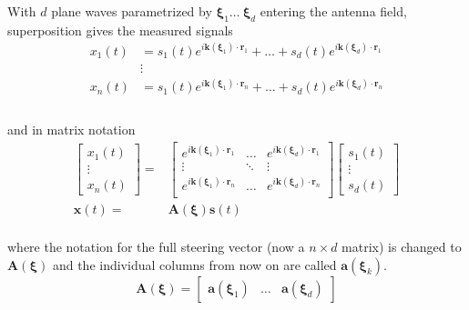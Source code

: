 \documentclass[11pt]{article}
\newcommand{\vct}[1]{\boldsymbol{#1}}
\begin{document}
With $d$ plane waves parametrized by $\vct{\xi}_1 \dots\ \vct{\xi}_d$ entering the antenna field, superposition gives the measured signals
\begin{equation}
    \begin{split}
        x_1(t)& = s_1(t)e^{i{\vct{k}(\vct{\xi}_1)}\cdot{\vct{r}_1}} + \dots + s_d(t)e^{i{\vct{k}(\vct{\xi}_d)}\cdot{\vct{r}_1}}\\
        &\vdots\\
        x_n(t)& = s_1(t)e^{i{\vct{k}(\vct{\xi}_1)}\cdot{\vct{r}_n}} + \dots + s_d(t)e^{i{\vct{k}(\vct{\xi}_d)}\cdot{\vct{r}_n}}\\
    \end{split}
\end{equation}
\\and in matrix notation
\begin{equation} \label{eq:4}
\begin{split}
    \begin{bmatrix}
        x_1(t)\\
        \vdots\\
        x_n(t)
    \end{bmatrix}
    =&
    \begin{bmatrix}
        e^{i{\vct{k}(\vct{\xi}_1)}\cdot{\vct{r}_1}} & \dots & e^{i{\vct{k}(\vct{\xi}_d)}\cdot{\vct{r}_1}}\\
        \vdots & \ddots & \vdots\\
        e^{i{\vct{k}(\vct{\xi}_1)}\cdot{\vct{r}_n}} & \dots & e^{i{\vct{k}(\vct{\xi}_d)}\cdot{\vct{r}_n}}\\
    \end{bmatrix}
    \begin{bmatrix}
        s_1(t)\\
        \vdots\\
        s_d(t)
    \end{bmatrix}
    \\
    \vct{x}(t) =& \vct{A}(\vct{\xi})\vct{s}(t)\\
\end{split}
\end{equation}

where the notation for the full steering vector (now a $n\times d$ matrix) is changed to $\vct{A}(\vct{\xi})$ and the individual columns from now on are called $\vct{a}(\vct{\xi}_k)$.
\begin{equation}
    \vct{A}(\vct{\xi}) = \begin{bmatrix}\vct{a}(\vct{\xi}_1)&\dots&\vct{a}(\vct{\xi}_d)\end{bmatrix}
\end{equation}
\end{document}
